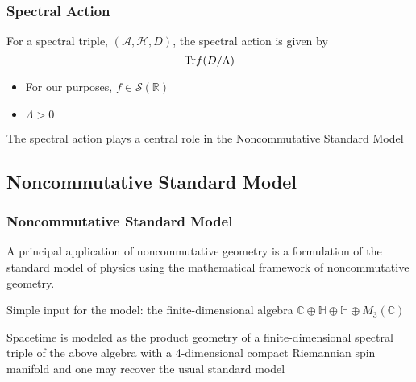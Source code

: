 \documentclass{beamer}
\def\C{{\mathbb C}}
\renewcommand{\H}{{\mathbb H}}
\def\R{{\mathbb R}}
\def\cA{{\mathcal A}}
\def\cH{{\mathcal H}}
\def\Tr{{\rm Tr}}
\begin{document}
\begin{frame}
	\frametitle{Spectral Action}

	\begin{block}{}
		For a spectral triple, $(\cA, \cH, D)$, the spectral action is given by
		\[
		\Tr f(D / \Lambda)
		\]
	\end{block}

	\pause

	\begin{itemize}
		\item For our purposes, $f \in \mathcal{S} (\R)$
		\item $\Lambda > 0$
	\end{itemize}

	\pause

	\begin{block}{}
		The spectral action plays a central role in the Noncommutative Standard Model
	\end{block}

\end{frame}


\subsection{Noncommutative Standard Model}

\begin{frame}
	\frametitle{Noncommutative Standard Model}

	\begin{block}{}
		A principal application of noncommutative geometry is a formulation of the standard model of physics using the mathematical framework of noncommutative geometry.
	\end{block}

	\pause

	\begin{block}{}
		Simple input for the model: the finite-dimensional algebra $\C \oplus \H \oplus \H \oplus M_3(\C)$
	\end{block}

	\pause

	\begin{block}{}
		Spacetime is modeled as the product geometry of a finite-dimensional spectral triple of the above algebra with a 4-dimensional compact Riemannian spin manifold and one may recover the usual standard model
	\end{block}

\end{frame}
\end{document}
